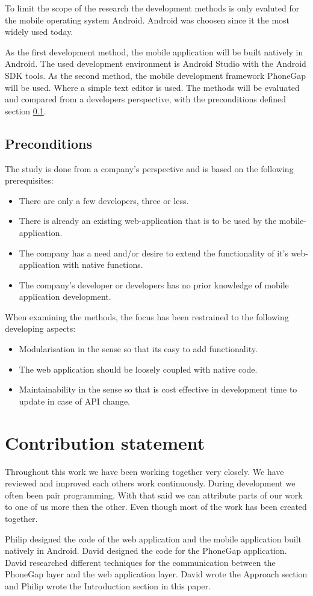 To limit the scope of the research the development methods is only evaluted for the mobile operating system Android. Android was choosen since it the most widely used today. 

As the first development method, the mobile application will be built natively in Android. The used development environment is Android Studio with the Android SDK tools. As the second method, the mobile development framework PhoneGap will be used. Where a simple text editor is used. The methods will be evaluated and compared from a developers perspective, with the preconditions defined section \ref{section-preconditions}.

\subsection{Preconditions} \label{section-preconditions}
The study is done from a company's perspective and is based on the following prerequisites:
\begin{itemize}
\item There are only a few developers, three or less.
\item There is already an existing web-application that is to be used by the mobile-application.
\item The company has a need and/or desire to extend the functionality of it's web-application with native functions.
\item The company's developer or developers has no prior knowledge of mobile application development.
\end{itemize}

When examining the methods, the focus has been restrained to the following developing aspects:
\begin{itemize}
\item Modularisation in the sense so that its easy to add functionality.
\item The web application should be loosely coupled with native code.
\item Maintainability in the sense so that is cost effective in development time to update in case of API change.
\end{itemize}
\section{Contribution statement}
Throughout this work we have been working together very closely. We have reviewed and improved each others work continuously. During development we often been pair programming. With that said we can attribute parts of our work to one of us more then the other. Even though most of the work has been created together. 

Philip designed the code of the web application and the mobile application built natively in Android. David designed the code for the PhoneGap application. David researched different techniques for the communication between the PhoneGap layer and the web application layer. David wrote the Approach section and Philip wrote the Introduction section in this paper. 
